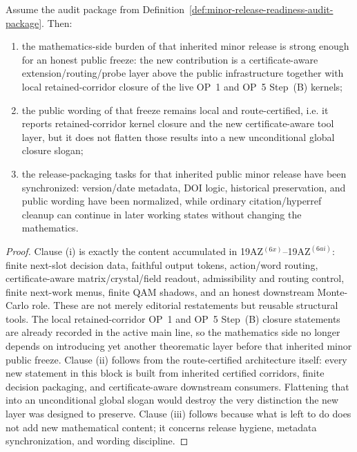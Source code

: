 \begin{proposition}
\label{prop:present-release-line-is-mathematically-minor-ready-and-release-packaged}
Assume the audit package from Definition~\ref{def:minor-release-readiness-audit-package}. Then:
\begin{enumerate}[label=(\roman*)]
 \item the mathematics-side burden of that inherited minor release is strong enough for an honest public freeze: the new contribution is a certificate-aware extension/routing/probe layer above the public  infrastructure together with local retained-corridor closure of the live OP~1 and OP~5 Step~(B) kernels;
 \item the public wording of that freeze remains local and route-certified, i.e. it reports retained-corridor kernel closure and the new certificate-aware tool layer, but it does not flatten those results into a new unconditional global closure slogan;
 \item the release-packaging tasks for that inherited public minor release have been synchronized: version/date metadata, DOI logic, historical preservation, and public wording have been normalized, while ordinary citation/hyperref cleanup can continue in later working states without changing the mathematics.
\end{enumerate}
\end{proposition}

\begin{proof}
Clause (i) is exactly the content accumulated in 19AZ$^{(6x)}$--19AZ$^{(6ai)}$: finite next-slot decision data, faithful output tokens, action/word routing, certificate-aware matrix/crystal/field readout, admissibility and routing control, finite next-work menus, finite QAM shadows, and an honest downstream Monte-Carlo role. These are not merely editorial restatements but reusable structural tools. The local retained-corridor OP~1 and OP~5 Step~(B) closure statements are already recorded in the active main line, so the mathematics side no longer depends on introducing yet another theorematic layer before that inherited minor public freeze. Clause (ii) follows from the route-certified architecture itself: every new statement in this block is built from inherited certified corridors, finite decision packaging, and certificate-aware downstream consumers. Flattening that into an unconditional global slogan would destroy the very distinction the new layer was designed to preserve. Clause (iii) follows because what is left to do does not add new mathematical content; it concerns release hygiene, metadata synchronization, and wording discipline.
\end{proof}

